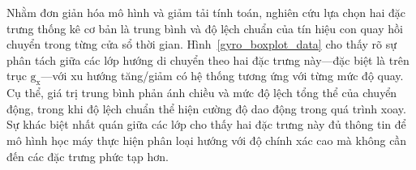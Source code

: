 Nhằm đơn giản hóa mô hình và giảm tải tính toán, nghiên cứu lựa chọn hai đặc trưng thống kê cơ bản là trung bình và độ lệch chuẩn của tín hiệu con quay hồi chuyển trong từng cửa sổ thời gian. Hình~\ref{gyro_boxplot_data} cho thấy rõ sự phân tách giữa các lớp hướng di chuyển theo hai đặc trưng này—đặc biệt là trên trục $\mathrm{g_x}$—với xu hướng tăng/giảm có hệ thống tương ứng với từng mức độ quay. Cụ thể, giá trị trung bình phản ánh chiều và mức độ lệch tổng thể của chuyển động, trong khi độ lệch chuẩn thể hiện cường độ dao động trong quá trình xoay. Sự khác biệt nhất quán giữa các lớp cho thấy hai đặc trưng này đủ thông tin để mô hình học máy thực hiện phân loại hướng với độ chính xác cao mà không cần đến các đặc trưng phức tạp hơn.